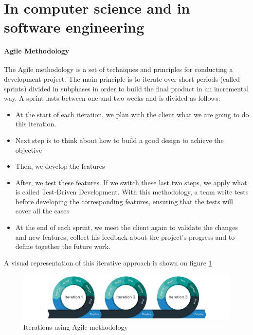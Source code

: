 

\section{In computer science and in software engineering}
\paragraph{Agile Methodology}
The Agile methodology is a set of techniques and principles for conducting a development project. The main principle is to iterate over short periods (called sprints) divided in subphases in order to build the final product in an incremental way.
A sprint lasts between one and two weeks and is divided as follows: 
\begin{itemize}
    \item At the start of each iteration, we plan with the client what we are going to do this iteration.
    \item Next step is to think about how to build a good design to achieve the objective
    \item Then, we develop the features
    \item After, we test these features. If we switch these last two steps, we apply what is called Test-Driven Development. With this methodology, a team write tests before developing the corresponding features, ensuring that the tests will cover all the cases
    \item At the end of each sprint, we meet the client again to validate the changes and new features, collect his feedback about the project's progress and to define together the future work.
\end{itemize}
A visual representation of this iterative approach is shown on figure \ref{fig:agile-methodology}


\begin{figure}
    \centering
    \includegraphics[width=\textwidth]{images/agile-methodolody.png}
    \caption{Iterations using Agile methodology}
    \label{fig:agile-methodology}
\end{figure}

